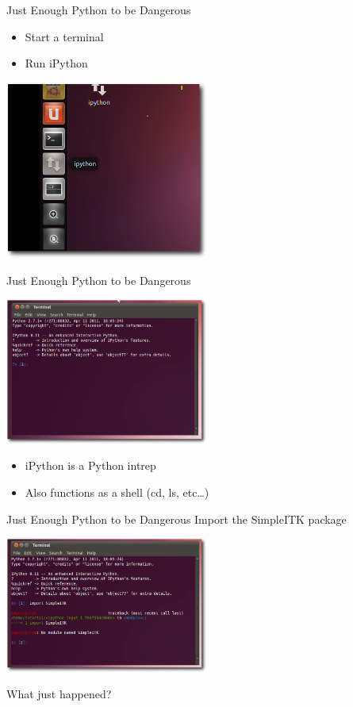 \begin{frame}{Just Enough Python to be Dangerous}
\begin{itemize}
  \item Start a terminal
  \item Run iPython
\end{itemize}
\begin{center}
  \includegraphics[width=0.5\textwidth]{Images/iPythonLaunch_shadow}
\end{center}
\end{frame}

\begin{frame}{Just Enough Python to be Dangerous}
\begin{center}
  \includegraphics[width=0.5\textwidth]{Images/iPythonWindow_shadow}
\end{center}
\begin{itemize}
  \item iPython is a Python intrep
  \item Also functions as a shell (cd, ls, etc\dots)
\end{itemize}
\end{frame}

\begin{frame}{Just Enough Python to be Dangerous}
Import the SimpleITK package
\begin{center}
  \includegraphics[width=0.5\textwidth]{Images/iPythonImportError_shadow}
\end{center}
What just happened?
\end{frame}

